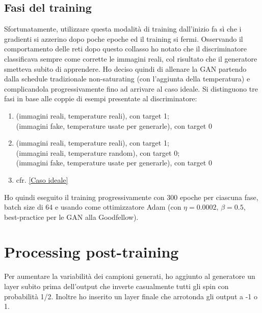 \documentclass[Lau, noexaminfo, oneside]{sapthesis} %
\begin{document}
\subsection{Fasi del training}
Sfortunatamente, utilizzare questa modalità di training dall'inizio fa sì che i gradienti si azzerino dopo poche epoche ed il training si fermi. Osservando il comportamento delle reti dopo questo collasso ho notato che il discriminatore classificava sempre come corrette le immagini reali, col risultato che il generatore smetteva subito di apprendere. Ho deciso quindi di allenare la GAN partendo dalla schedule tradizionale non-saturating (con l'aggiunta della temperatura) e complicandola progressivamente fino ad arrivare al caso ideale.
Si distinguono tre fasi in base alle coppie di esempi presentate al discriminatore:
\begin{enumerate}[label=\Alph*:]
\item (immagini reali, temperature reali), con target 1;\\(immagini fake, temperature usate per generarle), con target 0
\item (immagini reali, temperature reali), con target 1;\\(immagini reali, temperature random), con target 0;\\(immagini fake, temperature usate per generarle), con target 0
\item cfr. \ref{Caso ideale}
\end{enumerate}
Ho quindi eseguito il training progressivamente con 300 epoche per ciascuna fase, batch size di 64 e usando come ottimizzatore Adam \cite{adam} (con $\eta=0.0002,\,\beta=0.5$, best-practice per le GAN alla Goodfellow).
\section{Processing post-training}
Per aumentare la variabilità dei campioni generati, ho aggiunto al generatore un layer subito prima dell'output che inverte casualmente tutti gli spin con probabilità 1/2. Inoltre ho inserito un layer finale che arrotonda gli output a -1 o 1.
\end{document}
